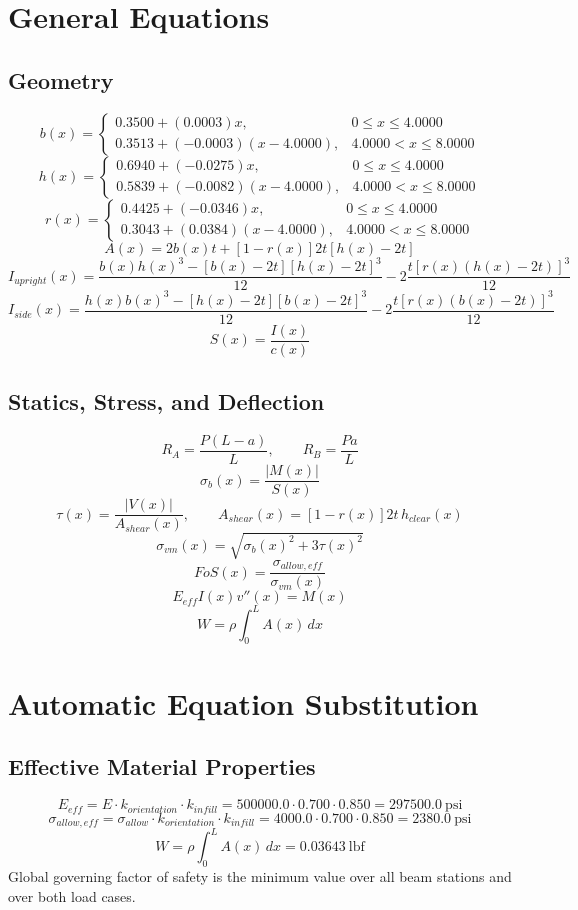 \documentclass[11pt]{article}
\begin{document}
\section*{General Equations}
\subsection*{Geometry}
\[
b(x)=\begin{cases}0.3500 + (0.0003)x, & 0 \le x \le 4.0000\\0.3513 + (-0.0003)(x-4.0000), & 4.0000 < x \le 8.0000\end{cases}
\]
\[
h(x)=\begin{cases}0.6940 + (-0.0275)x, & 0 \le x \le 4.0000\\0.5839 + (-0.0082)(x-4.0000), & 4.0000 < x \le 8.0000\end{cases}
\]
\[
r(x)=\begin{cases}0.4425 + (-0.0346)x, & 0 \le x \le 4.0000\\0.3043 + (0.0384)(x-4.0000), & 4.0000 < x \le 8.0000\end{cases}
\]
\[
A(x)=2b(x)t+[1-r(x)]2t[h(x)-2t]
\]
\[
I_{upright}(x)=\frac{b(x)h(x)^3-[b(x)-2t][h(x)-2t]^3}{12}-2\frac{t[r(x)(h(x)-2t)]^3}{12}
\]
\[
I_{side}(x)=\frac{h(x)b(x)^3-[h(x)-2t][b(x)-2t]^3}{12}-2\frac{t[r(x)(b(x)-2t)]^3}{12}
\]
\[
S(x)=\frac{I(x)}{c(x)}
\]

\subsection*{Statics, Stress, and Deflection}
\[
R_A=\frac{P(L-a)}{L}, \qquad R_B=\frac{Pa}{L}
\]
\[
\sigma_b(x)=\frac{|M(x)|}{S(x)}
\]
\[
\tau(x)=\frac{|V(x)|}{A_{shear}(x)}, \qquad A_{shear}(x)=[1-r(x)]2t\,h_{clear}(x)
\]
\[
\sigma_{vm}(x)=\sqrt{\sigma_b(x)^2+3\tau(x)^2}
\]
\[
FoS(x)=\frac{\sigma_{allow,eff}}{\sigma_{vm}(x)}
\]
\[
E_{eff}I(x)v''(x)=M(x)
\]
\[
W=\rho\int_0^L A(x)\,dx
\]

\section*{Automatic Equation Substitution}
\subsection*{Effective Material Properties}
\[E_{eff} = E \cdot k_{orientation} \cdot k_{infill} = 500000.0 \cdot 0.700 \cdot 0.850 = 297500.0\ \mathrm{psi}\]
\[\sigma_{allow,eff} = \sigma_{allow} \cdot k_{orientation} \cdot k_{infill} = 4000.0 \cdot 0.700 \cdot 0.850 = 2380.0\ \mathrm{psi}\]
\[W = \rho \int_0^L A(x)\,dx = 0.03643\ \mathrm{lbf}\]
Global governing factor of safety is the minimum value over all beam stations and over both load cases.
\end{document}
